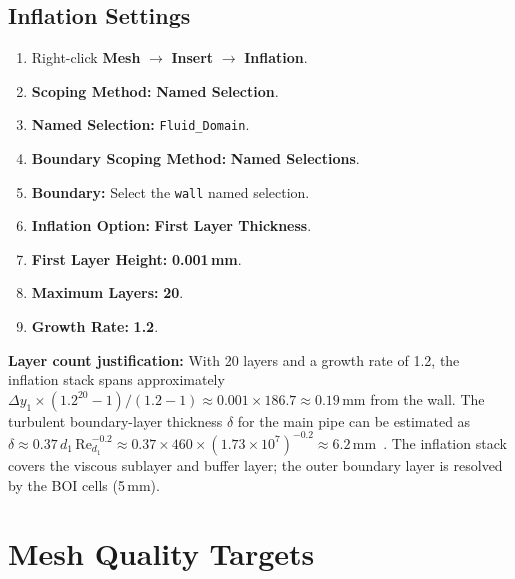 \documentclass[12pt,a4paper]{report}
\begin{document}
\medskip
\noindent{}

\subsection{Inflation Settings}

\begin{enumerate}
  \item Right-click \textbf{Mesh} $\rightarrow$ \textbf{Insert}
        $\rightarrow$ \textbf{Inflation}.
  \item \textbf{Scoping Method:} \textbf{Named Selection}.
  \item \textbf{Named Selection:} \texttt{Fluid\_Domain}.
  \item \textbf{Boundary Scoping Method:} \textbf{Named Selections}.
  \item \textbf{Boundary:} Select the \texttt{wall} named selection.
  \item \textbf{Inflation Option:} \textbf{First Layer Thickness}.
  \item \textbf{First Layer Height:} \textbf{0.001\,mm}.
  \item \textbf{Maximum Layers:} \textbf{20}.
  \item \textbf{Growth Rate:} \textbf{1.2}.
\end{enumerate}

\noindent\textbf{Layer count justification:} With 20 layers and a growth
rate of 1.2, the inflation stack spans approximately
$\Delta y_1 \times (1.2^{20} - 1)/(1.2 - 1) \approx 0.001 \times 186.7
\approx 0.19$\,mm from the wall.  The turbulent boundary-layer thickness
$\delta$ for the main pipe can be estimated as
$\delta \approx 0.37\,d_1\,\mathrm{Re}_{d_1}^{-0.2}
\approx 0.37 \times 460 \times (1.73 \times 10^7)^{-0.2}
\approx 6.2$\,mm~\cite{Schlichting2017}.
The inflation stack covers the viscous sublayer and buffer layer; the
outer boundary layer is resolved by the BOI cells (5\,mm).


\section{Mesh Quality Targets}
\end{document}
